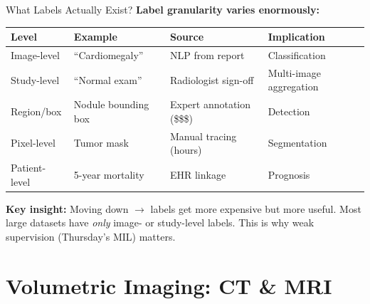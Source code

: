 \documentclass[aspectratio=169,10pt]{beamer}
\begin{document}
\begin{frame}{What Labels Actually Exist?}
\textbf{Label granularity varies enormously:}

\begin{center}
{\small
\renewcommand{\arraystretch}{1.1}
\begin{tabular}{p{2.2cm}p{2.8cm}p{2.8cm}p{3.5cm}}
\toprule
\textbf{Level} & \textbf{Example} & \textbf{Source} & \textbf{Implication} \\
\midrule
Image-level & ``Cardiomegaly'' & NLP from report & Classification \\
Study-level & ``Normal exam'' & Radiologist sign-off & Multi-image aggregation \\
Region/box & Nodule bounding box & Expert annotation (\$\$\$) & Detection \\
Pixel-level & Tumor mask & Manual tracing (hours) & Segmentation \\
Patient-level & 5-year mortality & EHR linkage & Prognosis \\
\bottomrule
\end{tabular}
}
\end{center}

\pause
\textbf{Key insight:} Moving down $\to$ labels get more expensive but more useful. Most large datasets have \emph{only} image- or study-level labels. This is why weak supervision (Thursday's MIL) matters.
\end{frame}

\section{Volumetric Imaging: CT \& MRI}
\end{document}
